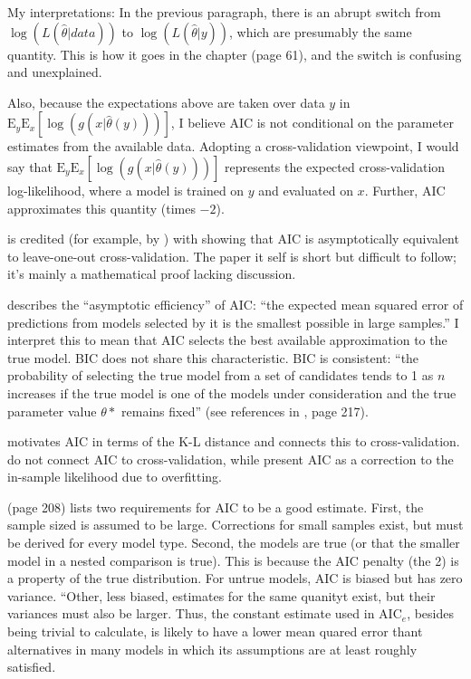 My interpretations: In the previous paragraph, there is an abrupt switch from 
	$\log( L(\hat \theta | data ) )$  
to
	$\log( L(\hat \theta | y ) )$, which are presumably the same quantity.
This is how it goes in the chapter (page 61), and the switch is confusing and unexplained. 

Also, because the expectations above are taken over data $y$ in 
	$\mathrm{E}_y \mathrm{E}_x [\log( g(x | \hat \theta(y)) )]$, 
I believe AIC is not conditional on the parameter estimates from the available data. Adopting a cross-validation viewpoint, I would say that
	$\mathrm{E}_y \mathrm{E}_x [\log( g(x | \hat \theta(y)) )]$
represents the expected cross-validation log-likelihood, where a model is trained on $y$ and evaluated on $x$. Further, AIC approximates this quantity (times $-2$).

\textcite{stone1977asymptotic} is credited (for example, by \cite{Hastie2009}) with showing that AIC is asymptotically equivalent to leave-one-out cross-validation. The paper it self is short but difficult to follow; it's mainly a mathematical proof lacking discussion.

\textcite{Kuha2004} describes the ``asymptotic efficiency'' of AIC: ``the expected mean squared error of predictions from models selected by it is the smallest possible in large samples.'' I interpret this to mean that AIC selects the best available approximation to the true model. BIC does not share this characteristic. BIC is consistent: ``the probability of selecting the true model from a set of candidates tends to 1 as $n$ increases if the true model is one of the models under consideration and the true parameter value $\theta*$ remains fixed'' (see references in \cite{Kuha2004}, page 217).

\textcite{Kuha2004} motivates AIC in terms of the K-L distance and connects this to cross-validation. \textcite{burnham2003model} do not connect AIC to cross-validation, while \textcite{Hastie2009} present AIC as a correction to the in-sample likelihood due to overfitting.

\textcite{Kuha2004} (page 208) lists two requirements for AIC to be a good estimate. First, the sample sized is assumed to be large. Corrections for small samples exist, but must be derived for every model type. Second, the models are true (or that the smaller model in a nested comparison is true). This is because the AIC penalty (the 2) is a property of the true distribution. For untrue models, AIC is biased but has zero variance. ``Other, less biased, estimates for the same quanityt exist, but their variances must also be larger. Thus, the constant estimate used in $\mathrm{AIC}_e$, besides being trivial to calculate, is likely to have a lower mean quared error thant alternatives in many models in which its assumptions are at least roughly satisfied.

